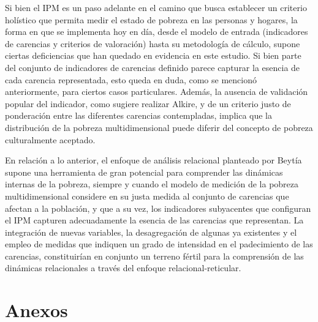 \documentclass[12pt,letterpaper,spanish]{article}
\begin{document}
\vspace{2em}



Si bien el IPM es un paso adelante en el camino que busca establecer un criterio holístico que permita medir el estado de pobreza en las personas y hogares, la forma en que se implementa hoy en día, desde el modelo de entrada (indicadores de carencias y criterios de valoración) hasta su metodología de cálculo, supone ciertas deficiencias que han quedado en evidencia en este estudio. Si bien parte del conjunto de indicadores de carencias definido parece capturar la esencia de cada carencia representada, esto queda en duda, como se mencionó anteriormente, para ciertos casos particulares. Además, la ausencia de validación popular del indicador, como sugiere realizar Alkire, y de un criterio justo de ponderación entre las diferentes carencias contempladas, implica que la distribución de la pobreza multidimensional puede diferir del concepto de pobreza culturalmente aceptado. 

En relación a lo anterior, el enfoque de análisis relacional planteado por Beytía supone una herramienta de gran potencial para comprender las dinámicas internas de la pobreza, siempre y cuando el modelo de medición de la pobreza multidimensional considere en su justa medida al conjunto de carencias que afectan a la población, y que a su vez, los indicadores subyacentes que configuran el IPM capturen adecuadamente la esencia de las carencias que representan. La integración de nuevas variables, la desagregación de algunas ya existentes y el empleo de medidas que indiquen un grado de intensidad en el padecimiento de las carencias, constituirían en conjunto un terreno fértil para la comprensión de las dinámicas relacionales a través del enfoque relacional-reticular.























\newpage
{}




\newpage
 \vspace*{\fill}
\section*{\centering Anexos}
 \vspace*{\fill}
\newpage
\end{document}
